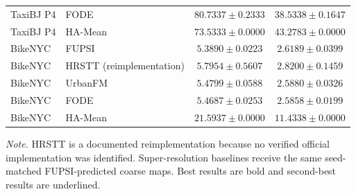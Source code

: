 \begin{table}[!htbp]
\begin{tabular}{llcc}
TaxiBJ P4 & FODE & $80.7337\pm0.2333$ & $38.5338\pm0.1647$ \\
TaxiBJ P4 & HA-Mean & $73.5333\pm0.0000$ & $43.2783\pm0.0000$ \\
\addlinespace
BikeNYC & FUPSI & \textbf{$5.3890\pm0.0223$} & $2.6189\pm0.0399$ \\
BikeNYC & HRSTT (reimplementation) & $5.7954\pm0.5607$ & $2.8200\pm0.1459$ \\
BikeNYC & UrbanFM & $5.4799\pm0.0588$ & \underline{$2.5880\pm0.0326$} \\
BikeNYC & FODE & \underline{$5.4687\pm0.0253$} & \textbf{$2.5858\pm0.0199$} \\
BikeNYC & HA-Mean & $21.5937\pm0.0000$ & $11.4338\pm0.0000$ \\
\bottomrule
\end{tabular}
\parbox{0.96\textwidth}{\footnotesize\textit{Note.} HRSTT is a documented reimplementation because no verified official implementation was identified. Super-resolution baselines receive the same seed-matched FUPSI-predicted coarse maps. Best results are bold and second-best results are underlined.}
\end{table}
